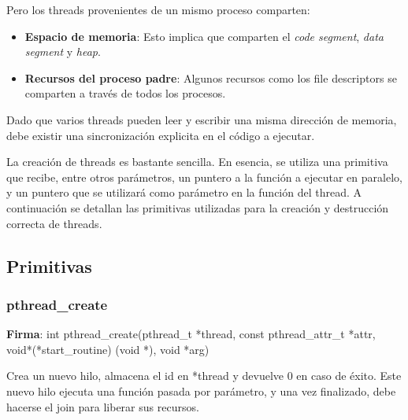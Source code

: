 \documentclass[a4paper, twoside]{article}
\begin{document}
Pero los threads provenientes de un mismo proceso comparten:
\begin{itemize}
	\item \textbf{Espacio de memoria}: Esto implica que comparten el \emph{code segment}, \emph{data segment} y \emph{heap}.
	\item \textbf{Recursos del proceso padre}: Algunos recursos como los file descriptors se comparten a través de todos los procesos.
\end{itemize}

Dado que varios threads pueden leer y escribir una misma dirección de memoria, debe existir una sincronización explicita en el código a ejecutar.

La creación de threads es bastante sencilla. En esencia, se utiliza una primitiva que recibe, entre otros parámetros, un puntero a la función a ejecutar en paralelo, y un puntero que se utilizará como parámetro en la función del thread. A continuación se detallan las primitivas utilizadas para la creación y destrucción correcta de threads.

\subsection{Primitivas}
\subsubsection{pthread\_create}
\textbf{Firma}: int pthread\_create(pthread\_t *thread, const pthread\_attr\_t *attr, void*(*start\_routine) (void *), void *arg)\par
Crea un nuevo hilo, almacena el id en *thread y devuelve 0 en caso de éxito. Este nuevo hilo ejecuta una función pasada por parámetro, y una vez finalizado, debe hacerse el join para liberar sus recursos.

\end{document}
